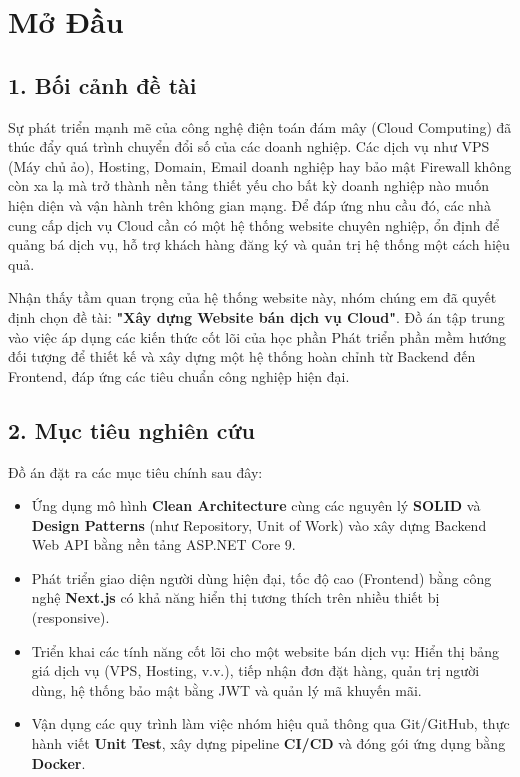 \chapter*{Mở Đầu}

\section*{1. Bối cảnh đề tài}
Sự phát triển mạnh mẽ của công nghệ điện toán đám mây (Cloud Computing) đã thúc đẩy quá trình chuyển đổi số của các doanh nghiệp. Các dịch vụ như VPS (Máy chủ ảo), Hosting, Domain, Email doanh nghiệp hay bảo mật Firewall không còn xa lạ mà trở thành nền tảng thiết yếu cho bất kỳ doanh nghiệp nào muốn hiện diện và vận hành trên không gian mạng. Để đáp ứng nhu cầu đó, các nhà cung cấp dịch vụ Cloud cần có một hệ thống website chuyên nghiệp, ổn định để quảng bá dịch vụ, hỗ trợ khách hàng đăng ký và quản trị hệ thống một cách hiệu quả.

Nhận thấy tầm quan trọng của hệ thống website này, nhóm chúng em đã quyết định chọn đề tài: \textbf{"Xây dựng Website bán dịch vụ Cloud"}. Đồ án tập trung vào việc áp dụng các kiến thức cốt lõi của học phần Phát triển phần mềm hướng đối tượng để thiết kế và xây dựng một hệ thống hoàn chỉnh từ Backend đến Frontend, đáp ứng các tiêu chuẩn công nghiệp hiện đại.

\section*{2. Mục tiêu nghiên cứu}
Đồ án đặt ra các mục tiêu chính sau đây:
\begin{itemize}
    \item Ứng dụng mô hình \textbf{Clean Architecture} cùng các nguyên lý \textbf{SOLID} và \textbf{Design Patterns} (như Repository, Unit of Work) vào xây dựng Backend Web API bằng nền tảng ASP.NET Core 9.
    \item Phát triển giao diện người dùng hiện đại, tốc độ cao (Frontend) bằng công nghệ \textbf{Next.js} có khả năng hiển thị tương thích trên nhiều thiết bị (responsive).
    \item Triển khai các tính năng cốt lõi cho một website bán dịch vụ: Hiển thị bảng giá dịch vụ (VPS, Hosting, v.v.), tiếp nhận đơn đặt hàng, quản trị người dùng, hệ thống bảo mật bằng JWT và quản lý mã khuyến mãi.
    \item Vận dụng các quy trình làm việc nhóm hiệu quả thông qua Git/GitHub, thực hành viết \textbf{Unit Test}, xây dựng pipeline \textbf{CI/CD} và đóng gói ứng dụng bằng \textbf{Docker}.
\end{itemize}

